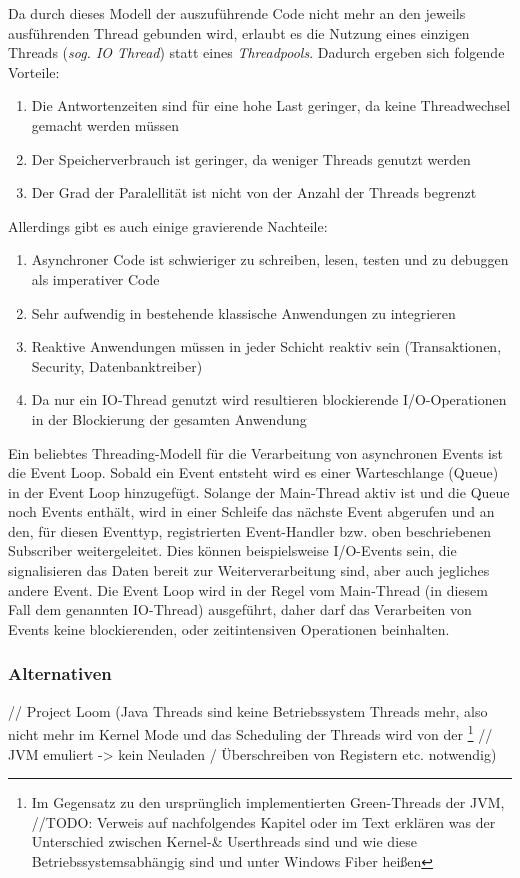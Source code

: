 Da durch dieses Modell der auszuführende Code nicht mehr an den jeweils ausführenden Thread gebunden wird, erlaubt es die Nutzung eines einzigen
Threads (\textit{sog. IO Thread}) statt eines \textit{Threadpools}.
Dadurch ergeben sich folgende Vorteile:

\begin{enumerate}
    \item Die Antwortenzeiten sind für eine hohe Last geringer, da keine Threadwechsel gemacht werden müssen
    \item Der Speicherverbrauch ist geringer, da weniger Threads genutzt werden
    \item Der Grad der Paralellität ist nicht von der Anzahl der Threads begrenzt
\end{enumerate}

Allerdings gibt es auch einige gravierende Nachteile:

\begin{enumerate}
    \item Asynchroner Code ist schwieriger zu schreiben, lesen, testen und zu debuggen als imperativer Code
    \item Sehr aufwendig in bestehende klassische Anwendungen zu integrieren
    \item Reaktive Anwendungen müssen in jeder Schicht reaktiv sein (Transaktionen, Security, Datenbanktreiber)
    \item Da nur ein IO-Thread genutzt wird resultieren blockierende I/O-Operationen in der Blockierung der gesamten Anwendung
\end{enumerate}

Ein beliebtes Threading-Modell für die Verarbeitung von asynchronen Events ist die Event Loop. Sobald ein Event entsteht wird es einer Warteschlange (Queue)
in der Event Loop hinzugefügt. Solange der Main-Thread aktiv ist und die Queue noch Events enthält, wird in einer Schleife das nächste Event
abgerufen und an den, für diesen Eventtyp, registrierten Event-Handler bzw. oben beschriebenen Subscriber weitergeleitet.
Dies können beispielsweise I/O-Events sein, die signalisieren das Daten bereit zur Weiterverarbeitung sind, aber auch jegliches andere Event.
Die Event Loop wird in der Regel vom Main-Thread (in diesem Fall dem genannten IO-Thread) ausgeführt, daher darf das Verarbeiten von Events
keine blockierenden, oder zeitintensiven Operationen beinhalten.

\subsubsection{Alternativen}
// Project Loom (Java Threads sind keine Betriebssystem Threads mehr, also nicht mehr im Kernel Mode und das Scheduling der Threads wird von der
\footnote{Im Gegensatz zu den ursprünglich implementierten Green-Threads der JVM,
    //TODO: Verweis auf nachfolgendes Kapitel oder im Text erklären was der Unterschied zwischen
    Kernel-\& Userthreads sind und wie diese Betriebssystemsabhängig sind und unter Windows Fiber heißen}
// JVM emuliert -> kein Neuladen / Überschreiben von Registern etc. notwendig)
